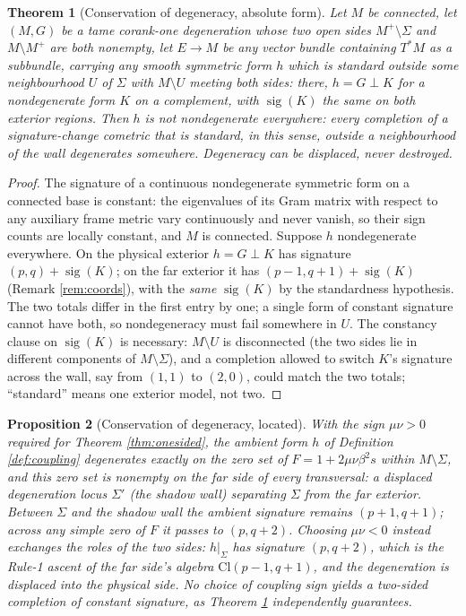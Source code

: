 \documentclass[11pt]{article}
\newtheorem{theorem}{Theorem}[section]
\newtheorem{proposition}[theorem]{Proposition}
\theoremstyle{definition}
\newcommand{\Cl}{\mathrm{Cl}}
\newcommand{\Sig}{\Sigma}
\newcommand{\Mp}{M^{+}}
\begin{document}
\begin{theorem}[Conservation of degeneracy, absolute form]\label{thm:absolute}
Let $M$ be connected, let $(M,G)$ be a tame corank-one degeneration whose two open sides $\Mp \setminus \Sig$ and $M \setminus \Mp$ are both nonempty, let $E \to M$ be \emph{any} vector bundle containing $T^*M$ as a subbundle, carrying \emph{any} smooth symmetric form $h$ which is \emph{standard} outside some neighbourhood $U$ of $\Sig$ with $M \setminus U$ meeting both sides: there, $h = G \perp K$ for a nondegenerate form $K$ on a complement, with $\operatorname{sig}(K)$ the same on both exterior regions. Then $h$ is not nondegenerate everywhere: every completion of a signature-change cometric that is standard, in this sense, outside a neighbourhood of the wall degenerates somewhere. Degeneracy can be displaced, never destroyed.
\end{theorem}

\begin{proof}
The signature of a continuous nondegenerate symmetric form on a connected base is constant: the eigenvalues of its Gram matrix with respect to any auxiliary frame metric vary continuously and never vanish, so their sign counts are locally constant, and $M$ is connected. Suppose $h$ nondegenerate everywhere. On the physical exterior $h = G \perp K$ has signature $(p,q) + \operatorname{sig}(K)$; on the far exterior it has $(p{-}1, q{+}1) + \operatorname{sig}(K)$ (Remark \ref{rem:coords}), with the \emph{same} $\operatorname{sig}(K)$ by the standardness hypothesis. The two totals differ in the first entry by one; a single form of constant signature cannot have both, so nondegeneracy must fail somewhere in $U$. The constancy clause on $\operatorname{sig}(K)$ is necessary: $M \setminus U$ is disconnected (the two sides lie in different components of $M \setminus \Sig$), and a completion allowed to switch $K$'s signature across the wall, say from $(1,1)$ to $(2,0)$, could match the two totals; ``standard'' means one exterior model, not two.
\end{proof}

\begin{proposition}[Conservation of degeneracy, located]\label{prop:conservation}
With the sign $\mu\nu > 0$ required for Theorem \ref{thm:onesided}, the ambient form $h$ of Definition \ref{def:coupling} degenerates exactly on the zero set of $F = 1 + 2\mu\nu\beta^2 s$ within $M \setminus \Sig$, and this zero set is nonempty on the far side of every transversal: a displaced degeneration locus $\Sig'$ (the \emph{shadow wall}) separating $\Sig$ from the far exterior. Between $\Sig$ and the shadow wall the ambient signature remains $(p{+}1, q{+}1)$; across any simple zero of $F$ it passes to $(p, q{+}2)$. Choosing $\mu\nu < 0$ instead exchanges the roles of the two sides: $h|_\Sig$ has signature $(p, q{+}2)$, which is the Rule-1 ascent of the far side's algebra $\Cl(p{-}1, q{+}1)$, and the degeneration is displaced into the physical side. No choice of coupling sign yields a two-sided completion of constant signature, as Theorem \ref{thm:absolute} independently guarantees.
\end{proposition}
\end{document}
